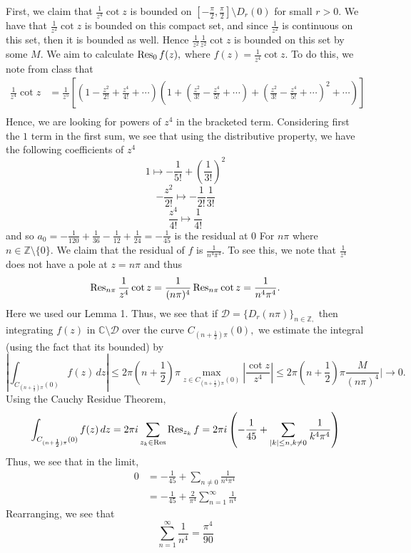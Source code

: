 \documentclass[11pt]{article}
\newcommand{\bbC}{\mathbb{C}}
\newcommand{\bbZ}{\mathbb{Z}}
\newcommand{\sm}{\setminus}
\begin{document}
\begin{solution}
    First, we claim that $\frac{1}{z^4}\cot z$ is bounded on $[-\frac{\pi}{2}, \frac{\pi }{2}]\sm D_{r}(0)$ for small $r>0.$ We have that $\frac{1}{z^2}  \cot z$ is bounded on this compact set, and since $\frac{1}{z^2}$ is continuous on this set, then it is bounded as well. Hence $\frac{1}{z^2}\frac{1}{z^2}\cot z$ is bounded on this set by some $M.$ We aim to calculate $\Res_{0}f(z),$ where $f(z) = \frac{1}{z^4}\cot z.$ To do this, we note from class that 
    \begin{align*}
        \frac{1}{z^4}\cot z &= \frac{1}{z^5}\left[(1 - \frac{z^2}{2!} + \frac{z^4}{4!} + \cdots)(1 + (\frac{z^2}{3!} - \frac{z^4}{5!}+\cdots)+ (\frac{z^2}{3!} - \frac{z^4}{5!}+\cdots)^2 + \cdots)\right]\\
    \end{align*}
    Hence, we are looking for powers of $z^4$ in the bracketed term. Considering first the $1$ term in the first sum, we see that using the distributive property, we have the following coefficients of $z^4$
    \[1 \mapsto -\frac{1}{5!} + (\frac{1}{3!})^2\]
    \[-\frac{z^2}{2!}\mapsto -\frac{1}{2!}\frac{1}{3!}\]
    \[\frac{z^4}{4!}\mapsto \frac{1}{4!}\] 
    and so $a_0 = -\frac{1}{120} + \frac{1}{36} - \frac{1}{12} + \frac{1}{24}= -\frac{1 }{45}$ is the residual at $0$ For $n\pi$ where $n\in \bbZ\sm \{0\}.$ We claim that the residual of $f$ is $\frac{1}{n^4\pi^4}.$ To see this, we note that $\frac{1}{z^4}$ does not have a pole at $z = n\pi$ and thus 
    \[\Res_{n\pi} \frac{1}{z^4} \cot z = \frac{1}{(n\pi)^4}\Res_{n\pi}\cot z = \frac{1}{n^4\pi^4}.\] Here we used our Lemma 1. Thus, we see that if $\mathcal{D} = \{D_r(n\pi)\}_{n \in \bbZ,}$ then integrating $f(z)$ in $\bbC\sm \mathcal{D}$ over the curve $C_{(n + \frac{1}{2})\pi}(0),$ we estimate the integral (using the fact that its bounded) by
    \[\left|\int_{C_{(n + \frac{1}{2})\pi}(0)} f(z)\,dz\right| \leq 2\pi (n+\frac{1}{2})\pi \max_{z\in C_{(n + \frac{1}{2})\pi}(0)}|\frac{\cot z}{z^4}| \leq 2\pi (n+\frac{1}{2})\pi \frac{M}{(n\pi)^4}|\to 0.\] Using the Cauchy Residue Theorem, 
    \[\int_{C_{(n + \frac{1}{2})\pi}(0)} f(z)\,dz = 2\pi i \sum_{z_k \in \Res} \Res_{z_k}f = 2\pi i\left(-\frac{1}{45}+ \sum_{|k|\leq n, k\neq 0} \frac{1}{k^4\pi^4}\right)\] Thus, we see that in the limit,
    \begin{align*}
        0 &= -\frac{1}{45}+ \sum_{n\neq 0} \frac{1}{n^4\pi^4}\\
        &= -\frac{1}{45} + \frac{2}{\pi^4}\sum_{n=1}^\infty \frac{1}{n^4}
    \end{align*}
    Rearranging, we see that 
    \[\sum_{n=1}^\infty \frac{1}{n^4} = \frac{\pi^4}{90}\]
    
\end{solution}
\end{document}
